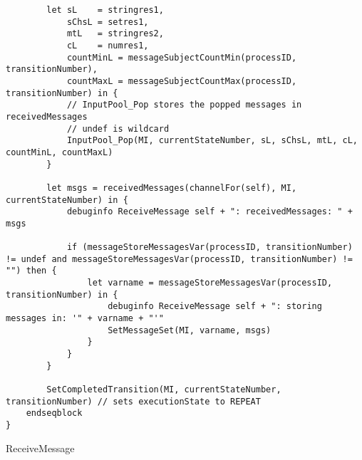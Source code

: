 \begin{listing}[H]
\begin{verbatim}
        let sL    = stringres1,
            sChsL = setres1,
            mtL   = stringres2,
            cL    = numres1,
            countMinL = messageSubjectCountMin(processID, transitionNumber),
            countMaxL = messageSubjectCountMax(processID, transitionNumber) in {
            // InputPool_Pop stores the popped messages in receivedMessages
            // undef is wildcard
            InputPool_Pop(MI, currentStateNumber, sL, sChsL, mtL, cL, countMinL, countMaxL)
        }

        let msgs = receivedMessages(channelFor(self), MI, currentStateNumber) in {
            debuginfo ReceiveMessage self + ": receivedMessages: " + msgs

            if (messageStoreMessagesVar(processID, transitionNumber) != undef and messageStoreMessagesVar(processID, transitionNumber) != "") then {
                let varname = messageStoreMessagesVar(processID, transitionNumber) in {
                    debuginfo ReceiveMessage self + ": storing messages in: '" + varname + "'"
                    SetMessageSet(MI, varname, msgs)
                }
            }
        }

        SetCompletedTransition(MI, currentStateNumber, transitionNumber) // sets executionState to REPEAT
    endseqblock
}
\end{verbatim}
\caption{ReceiveMessage}
\label{lst:asm:ReceiveMessage}
\end{listing}




